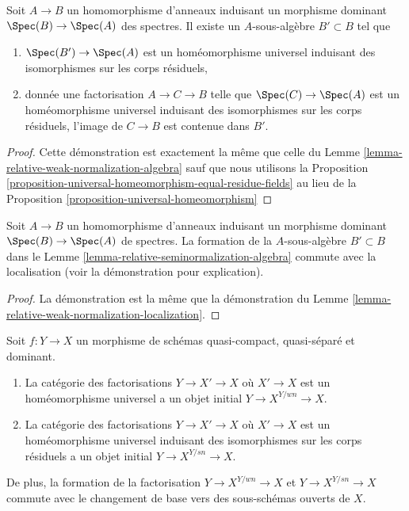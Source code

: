 \begin{lemma}
\label{lemma-relative-seminormalization-algebra}
Soit $A \to B$ un homomorphisme d'anneaux induisant un morphisme
dominant $\Spec(B) \to \Spec(A)$ des spectres. Il existe un $A$-sous-algèbre
$B' \subset B$ tel que
\begin{enumerate}
\item $\Spec(B') \to \Spec(A)$ est un homéomorphisme universel induisant des isomorphismes
sur les corps résiduels,
\item donnée une factorisation $A \to C \to B$ telle que $\Spec(C) \to \Spec(A)$ est un homéomorphisme
universel induisant des isomorphismes sur les corps résiduels, l'image
de $C \to B$ est contenue dans $B'$.
\end{enumerate}
\end{lemma}

\begin{proof}
Cette démonstration est exactement
la même que celle du Lemme \ref{lemma-relative-weak-normalization-algebra}
sauf que nous utilisons la Proposition \ref{proposition-universal-homeomorphism-equal-residue-fields}
au lieu de la Proposition \ref{proposition-universal-homeomorphism}
\end{proof}

\begin{lemma}
\label{lemma-relative-seminormalization-localization}
Soit $A \to B$ un homomorphisme d'anneaux induisant un morphisme
dominant $\Spec(B) \to \Spec(A)$ de spectres. La formation de la $A$-sous-algèbre
$B' \subset B$ dans le Lemme \ref{lemma-relative-seminormalization-algebra} commute avec la
localisation (voir la démonstration pour explication).
\end{lemma}

\begin{proof}
La démonstration est la même
que la démonstration du Lemme \ref{lemma-relative-weak-normalization-localization}.
\end{proof}

\begin{lemma}
\label{lemma-relative-seminormalization}
Soit $f : Y \to X$ un morphisme de schémas quasi-compact, quasi-séparé
et dominant.
\begin{enumerate}
\item La catégorie des factorisations $Y \to X' \to X$ où $X' \to X$
est un homéomorphisme universel a un objet initial $Y \to X^{Y/wn} \to X$.
\item La catégorie des factorisations $Y \to X' \to X$ où $X' \to X$ est un
homéomorphisme universel induisant des isomorphismes sur les corps
résiduels a un objet initial $Y \to X^{Y/sn} \to X$.
\end{enumerate}
De plus, la formation de la factorisation $Y \to X^{Y/wn} \to X$ et $Y \to X^{Y/sn} \to X$ commute
avec le changement de base vers des sous-schémas ouverts de $X$.
\end{lemma}

